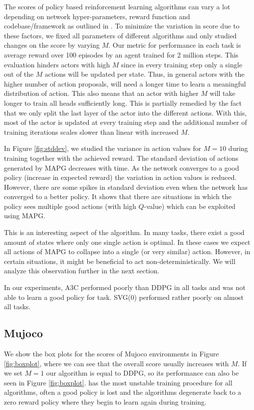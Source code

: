 The scores of policy based reinforcement learning algorithms can vary a lot depending on network hyper-parameters, reward function and codebase/framework as outlined in \cite{henderson2017deep}. To minimize the variation in score due to these factors, we fixed all parameters of different algorithms and only studied changes on the score by varying $M$. Our metric for performance in each task is average reward over 100 episodes by an agent trained for 2 million steps.
This evaluation hinders actors with high $M$ since in every training step only a single out of the $M$ actions will be updated per state. Thus, in general actors with the higher number of action proposals, will need a longer time to learn a meaningful distribution of action. This also means that an actor with higher $M$ will take longer to train all heads sufficiently long. This is partially remedied by the fact that we only split the last layer of the actor into the different actions. With this, most of the actor is updated at every training step and the additional number of training iterations scales slower than linear with increased $M$.

In Figure \ref{fig:stddev}, we studied the variance in action values for $M=10$ during training together with the achieved reward. The standard deviation of actions generated by MAPG decreases with time.
As the network converges to a good policy (increase in expected reward) the variation in action values is reduced. However, there are some spikes in standard deviation even when the network has converged to a better policy. It shows that there are situations in which the policy sees multiple good actions (with high $Q$-value) which can be exploited using MAPG.

This is an interesting aspect of the algorithm. In many tasks, there exist a good amount of states where only one single action is optimal. In these cases we expect all actions of MAPG to collapse into a single (or very similar) action. However, in certain situations, it might be beneficial to act non-deterministically. We will analyze this observation further in the next section.

In our experiments, A3C performed poorly than DDPG in all tasks and was not able to learn a good policy for  task. SVG(0) performed rather poorly on almost all tasks.

\subsection{Mujoco}
We show the box plots for the scores of Mujoco environments in Figure \ref{fig:boxplot}, where we can see that the overall score usually increases with $M$. If we set $M=1$ our algorithm is equal to DDPG, so its performance can also be seen in Figure \ref{fig:boxplot}.
 has the most unstable training procedure for all algorithms, often a good policy is lost and the algorithms degenerate back to a zero reward policy where they begin to learn again during training.


